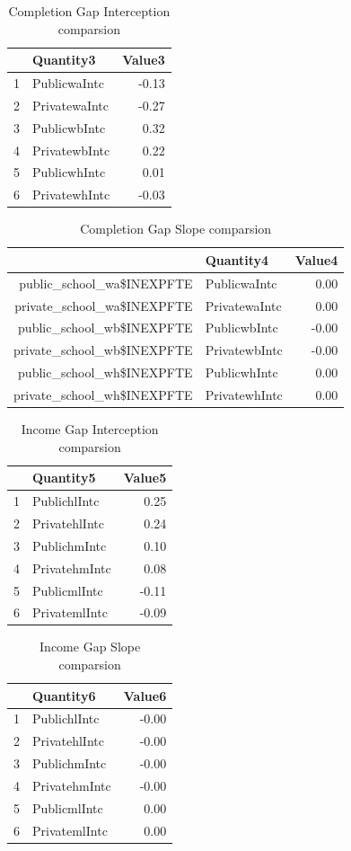 \documentclass{article}
\begin{document}
\begin{table}[ht]
\centering
\caption{Completion Gap Interception comparsion} 
\begin{tabular}{rlr}
  \hline
 & Quantity3 & Value3 \\ 
  \hline
1 & PublicwaIntc & -0.13 \\ 
  2 & PrivatewaIntc & -0.27 \\ 
  3 & PublicwbIntc & 0.32 \\ 
  4 & PrivatewbIntc & 0.22 \\ 
  5 & PublicwhIntc & 0.01 \\ 
  6 & PrivatewhIntc & -0.03 \\ 
   \hline
\end{tabular}
\end{table}
\begin{table}[ht]
\centering
\caption{Completion Gap Slope comparsion} 
\begin{tabular}{rlr}
  \hline
 & Quantity4 & Value4 \\ 
  \hline
public\_school\_wa\$INEXPFTE & PublicwaIntc & 0.00 \\ 
  private\_school\_wa\$INEXPFTE & PrivatewaIntc & 0.00 \\ 
  public\_school\_wb\$INEXPFTE & PublicwbIntc & -0.00 \\ 
  private\_school\_wb\$INEXPFTE & PrivatewbIntc & -0.00 \\ 
  public\_school\_wh\$INEXPFTE & PublicwhIntc & 0.00 \\ 
  private\_school\_wh\$INEXPFTE & PrivatewhIntc & 0.00 \\ 
   \hline
\end{tabular}
\end{table}
\begin{table}[ht]
\centering
\caption{Income Gap Interception comparsion} 
\begin{tabular}{rlr}
  \hline
 & Quantity5 & Value5 \\ 
  \hline
1 & PublichlIntc & 0.25 \\ 
  2 & PrivatehlIntc & 0.24 \\ 
  3 & PublichmIntc & 0.10 \\ 
  4 & PrivatehmIntc & 0.08 \\ 
  5 & PublicmlIntc & -0.11 \\ 
  6 & PrivatemlIntc & -0.09 \\ 
   \hline
\end{tabular}
\end{table}
\begin{table}[ht]
\centering
\caption{Income Gap Slope comparsion} 
\begin{tabular}{rlr}
  \hline
 & Quantity6 & Value6 \\ 
  \hline
1 & PublichlIntc & -0.00 \\ 
  2 & PrivatehlIntc & -0.00 \\ 
  3 & PublichmIntc & -0.00 \\ 
  4 & PrivatehmIntc & -0.00 \\ 
  5 & PublicmlIntc & 0.00 \\ 
  6 & PrivatemlIntc & 0.00 \\ 
   \hline
\end{tabular}
\end{table}
\end{document}
